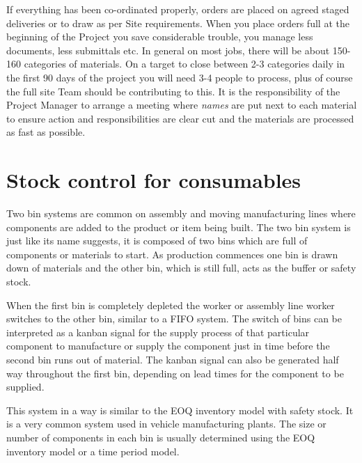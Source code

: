 If everything has been co-ordinated properly, orders are placed on agreed staged deliveries or to
draw as per Site requirements. When you place orders full at the beginning of the Project you
save considerable trouble, you manage less documents, less submittals etc. In general on most
jobs, there will be about 150-160 categories of materials. On a target to close between 2-3 categories daily in the first 90 days of the project you will need 3-4 people to process, plus of course the full site Team should be contributing to this. It is the responsibility of the Project Manager to arrange a meeting where \textit{names} are put next to each material to ensure action and responsibilities are clear cut and the materials are processed as fast as possible.


\section*{Stock control for consumables}

Two bin systems are common on assembly and moving manufacturing lines where components are added to the product or item being built. The two bin system is just like its name suggests, it is composed of two bins which are full of components or materials to start. As production commences one bin is drawn down of materials and the other bin, which is still full, acts as the buffer or safety stock.

When the first bin is completely depleted the worker or assembly line worker switches to the other bin, similar to a FIFO system. The switch of bins can be interpreted as a kanban signal for the supply process of that particular component to manufacture or supply the component just in time before the second bin runs out of material. The kanban signal can also be generated half way throughout the first bin, depending on lead times for the component to be supplied. 

This system in a way is similar to the EOQ inventory model with safety stock. It is a very common system used in vehicle manufacturing plants. The size or number of components in each bin is usually determined using the EOQ inventory model or a time period model. 